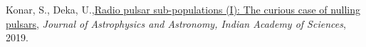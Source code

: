 \begin{itemize}[noitemsep]
{
\item Konar, S., Deka, U.,\href{https://www.ias.ac.in/article/fulltext/joaa/040/05/0042}{Radio pulsar sub-populations (I): The curious case of nulling pulsars}, \textit{Journal of Astrophysics and Astronomy, Indian Academy of Sciences}, 2019.
}\end{itemize}
